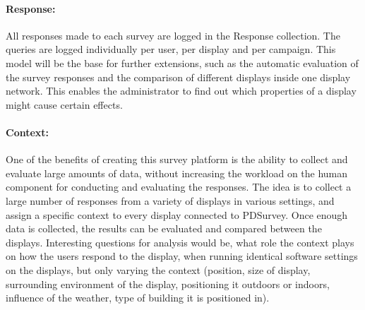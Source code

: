 	\paragraph{Response:} All responses made to each survey are logged in the Response collection. The queries are logged individually per user, per display and per campaign. This model will be the base for further extensions, such as the automatic evaluation of the survey responses and the comparison of different displays inside one display network. This enables the administrator to find out which properties of a display might cause certain effects.

	\paragraph{Context:} One of the benefits of creating this survey platform is the ability to collect and evaluate large amounts of data, without increasing the workload on the human component for conducting and evaluating the responses. The idea is to collect a large number of responses from a variety of displays in various settings, and assign a specific context to every display connected to PDSurvey. Once enough data is collected, the results can be evaluated and compared between the displays. Interesting questions for analysis would be, what role the context plays on how the users respond to the display, when running identical software settings on the displays, but only varying the context (position, size of display, surrounding environment of the display, positioning it outdoors or indoors, influence of the weather, type of building it is positioned in).



